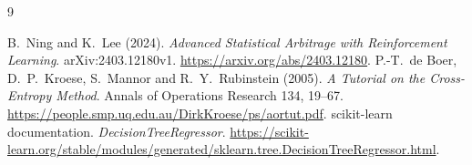 \documentclass[11pt,letterpaper]{article}
\begin{document}
\begin{thebibliography}{9}
\raggedright
{} B.~Ning and K.~Lee (2024).
\emph{Advanced Statistical Arbitrage with Reinforcement Learning}.
arXiv:2403.12180v1. \url{https://arxiv.org/abs/2403.12180}.
 P.-T.~de Boer, D.~P.~Kroese, S.~Mannor and R.~Y.~Rubinstein (2005).
\emph{A Tutorial on the Cross-Entropy Method}.
Annals of Operations Research 134, 19--67.
\url{https://people.smp.uq.edu.au/DirkKroese/ps/aortut.pdf}.
 scikit-learn documentation. \emph{DecisionTreeRegressor}.
\url{https://scikit-learn.org/stable/modules/generated/sklearn.tree.DecisionTreeRegressor.html}.
\end{thebibliography}
\end{document}
